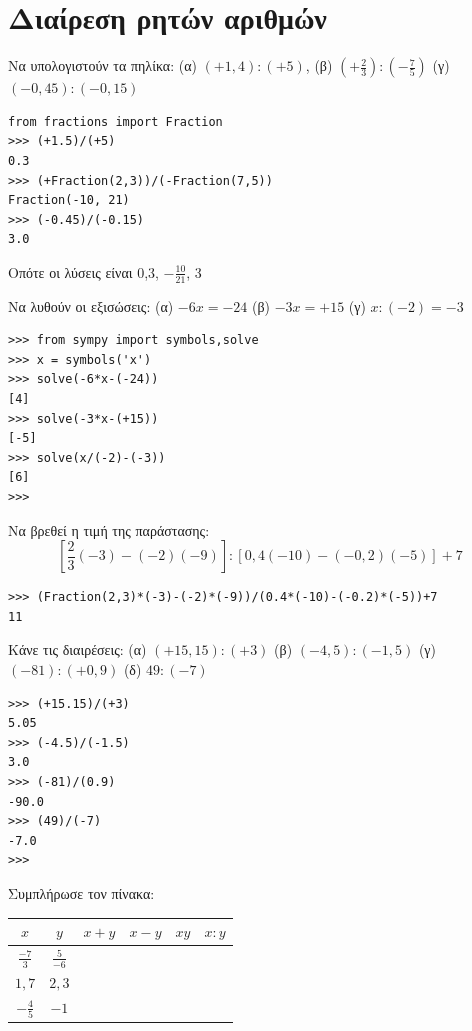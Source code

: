 \section{Διαίρεση ρητών αριθμών}
\begin{exercise}
Να υπολογιστούν τα πηλίκα:
(α) $(+1,4):(+5)$, (β) $\left(+\frac{2}{3}\right):\left(-\frac{7}{5}\right)$
(γ) $(-0,45):(-0,15)$
\end{exercise}
\begin{lstlisting}
from fractions import Fraction
>>> (+1.5)/(+5)
0.3
>>> (+Fraction(2,3))/(-Fraction(7,5))
Fraction(-10, 21)
>>> (-0.45)/(-0.15)
3.0
\end{lstlisting}
Οπότε οι λύσεις είναι 0,3, $-\frac{10}{21}$, 3
\begin{exercise}
Να λυθούν οι εξισώσεις: (α) $-6x=-24$ (β) $-3x=+15$ (γ) $x:(-2) = -3$
\end{exercise}
\begin{lstlisting}
>>> from sympy import symbols,solve
>>> x = symbols('x')
>>> solve(-6*x-(-24))
[4]
>>> solve(-3*x-(+15))
[-5]
>>> solve(x/(-2)-(-3))
[6]
>>>
\end{lstlisting}
\begin{exercise}
 Να βρεθεί η τιμή της παράστασης:
$$\left[\frac{2}{3}(-3)-(-2)(-9)\right]:[0,4(-10)-(-0,2)(-5)]+7$$
\end{exercise}
\begin{lstlisting}
>>> (Fraction(2,3)*(-3)-(-2)*(-9))/(0.4*(-10)-(-0.2)*(-5))+7
11
\end{lstlisting}
\begin{exercise}
Κάνε τις διαιρέσεις:
(α) $(+15,15):(+3)$
(β) $(-4,5):(-1,5)$
(γ) $(-81):(+0,9)$
(δ) $49:(-7)$
\end{exercise}
\begin{lstlisting}
>>> (+15.15)/(+3)
5.05
>>> (-4.5)/(-1.5)
3.0
>>> (-81)/(0.9)
-90.0
>>> (49)/(-7)
-7.0
>>>
\end{lstlisting}
\begin{exercise}
Συμπλήρωσε τον πίνακα:
\begin{table}[h]
\begin{tabular}{|c|c|c|c|c|c|}
\hline
$x$&$y$&$x+y$&$x-y$&$xy$&$x:y$\\\hline
$\frac{-7}{3}$&$\frac{5}{-6}$& & & & \\\hline
$1,7$&$2,3$&& & &  \\\hline
$-\frac{4}{5}$&$-1$&& & &  \\\hline
\end{tabular}
\end{table}
\end{exercise}
